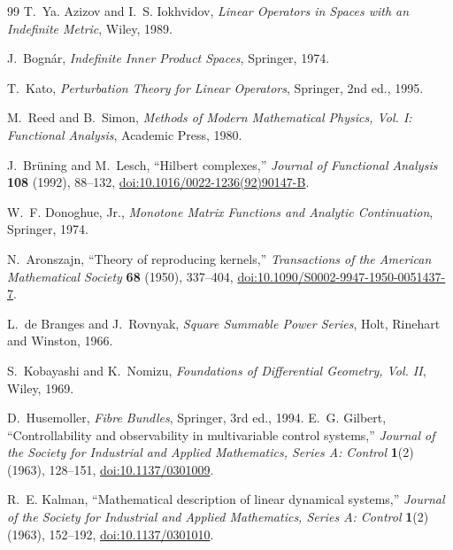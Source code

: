\documentclass[11pt,reqno]{scrartcl}
\theoremstyle{plain}
\theoremstyle{definition}
\theoremstyle{remark}
\begin{document}
\clearpage
\begin{thebibliography}{99}
T.~Ya. Azizov and I.~S. Iokhvidov,
\emph{Linear Operators in Spaces with an Indefinite Metric},
Wiley, 1989.

J.~Bogn\'ar,
\emph{Indefinite Inner Product Spaces},
Springer, 1974.

T.~Kato,
\emph{Perturbation Theory for Linear Operators},
Springer, 2nd ed., 1995.

M.~Reed and B.~Simon,
\emph{Methods of Modern Mathematical Physics, Vol. I: Functional Analysis},
Academic Press, 1980.

J.~Br\"uning and M.~Lesch,
``Hilbert complexes,''
\emph{Journal of Functional Analysis} \textbf{108} (1992), 88--132,
\href{https://doi.org/10.1016/0022-1236(92)90147-B}{doi:10.1016/0022-1236(92)90147-B}.

W.~F. Donoghue, Jr.,
\emph{Monotone Matrix Functions and Analytic Continuation},
Springer, 1974.

N.~Aronszajn,
``Theory of reproducing kernels,''
\emph{Transactions of the American Mathematical Society} \textbf{68}
(1950), 337--404,
\href{https://doi.org/10.1090/S0002-9947-1950-0051437-7}{doi:10.1090/S0002-9947-1950-0051437-7}.

L.~de Branges and J.~Rovnyak,
\emph{Square Summable Power Series},
Holt, Rinehart and Winston, 1966.


S.~Kobayashi and K.~Nomizu,
\emph{Foundations of Differential Geometry, Vol. II},
Wiley, 1969.

D.~Husemoller,
\emph{Fibre Bundles},
Springer, 3rd ed., 1994.
E.~G. Gilbert,
``Controllability and observability in multivariable control systems,''
\emph{Journal of the Society for Industrial and Applied Mathematics,
Series A: Control} \textbf{1}(2) (1963), 128--151,
\href{https://doi.org/10.1137/0301009}{doi:10.1137/0301009}.

R.~E. Kalman,
``Mathematical description of linear dynamical systems,''
\emph{Journal of the Society for Industrial and Applied Mathematics,
Series A: Control} \textbf{1}(2) (1963), 152--192,
\href{https://doi.org/10.1137/0301010}{doi:10.1137/0301010}.

\end{thebibliography}
\end{document}
